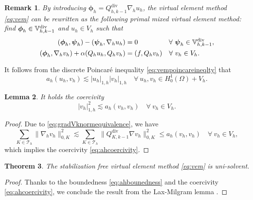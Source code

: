 \documentclass[10pt]{amsart}
\newtheorem{theorem}{Theorem}[section]
\newtheorem{lemma}[theorem]{Lemma}
\newtheorem{remark}[theorem]{Remark}
\renewcommand{\div}{\operatorname{div}}
\numberwithin{equation}{section}
\begin{document}
\begin{remark}\rm
By introducing $\boldsymbol{\phi}_h=Q_{h,k-1}^{\div}\nabla_h u_h$, the virtual element method \eqref{eq:vem} can be rewritten as the following primal mixed virtual element method: find $\boldsymbol{\phi}_h\in\mathbb{V}_{h,k-1}^{\rm div}$ and $u_h\in V_h$ such that
\begin{equation*}
\begin{aligned}
(\boldsymbol{\phi}_h, \boldsymbol{\psi}_h) - (\boldsymbol{\psi}_h, \nabla_h u_h)&=0 \quad\quad\quad\quad\;\;\forall~\boldsymbol{\psi}_h\in\mathbb{V}_{h,k-1}^{\rm div},\\
(\boldsymbol{\phi}_h, \nabla_h v_h)+\alpha(Q_hu_h, Q_hv_h)&=(f, Q_hv_h)\quad\forall~v_h\in V_h.
\end{aligned}
\end{equation*}
\end{remark}

It follows from the discrete Poincar\'e inequality \eqref{eq:vempoincareineqlty} that 
\begin{equation}\label{eq:ahbounedness}
a_h(u_h, v_h)\lesssim |u_h|_{1,h}|v_h|_{1,h}\quad\forall~u_h,v_h\in H_0^1(\Omega)+V_h.
\end{equation}  
\begin{lemma}
It holds the coercivity
\begin{equation}\label{eq:ahcoercivity}
|v_h|_{1,h}^2\lesssim a_h(v_h, v_h)\quad\forall~v_h\in V_h.
\end{equation}  
\end{lemma}
\begin{proof}
Due to \eqref{eq:gradVknormequivalence}, we have
$$
\sum_{K\in\mathcal T_h}\|\nabla_h v_h\|_{0,K}^2\lesssim \sum_{K\in\mathcal T_h}\|Q_{K,k-1}^{\div}\nabla v_h\|_{0,K}^2\leq a_h(v_h, v_h)\quad\forall~v_h\in V_h,
$$
which implies the coercivity \eqref{eq:ahcoercivity}.
\end{proof}

\begin{theorem}
The stabilization free virtual element method \eqref{eq:vem} is uni-solvent.
\end{theorem}
\begin{proof}
Thanks to the boundedness \eqref{eq:ahbounedness} and the coercivity \eqref{eq:ahcoercivity}, we conclude the result from the Lax-Milgram lemma \cite{LaxMilgram1954}.
\end{proof}
\end{document}

